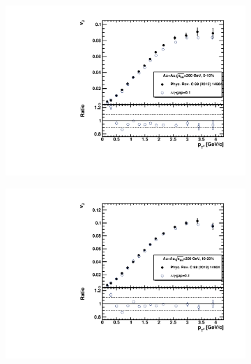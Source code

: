 \begin{figure}[ht]
    \begin{subfigure}{.49\textwidth}
        \centering
        \includegraphics[width=1.\linewidth]{Figures/v3_charged_hadrons_pt_cent0.pdf}
    \end{subfigure}
    \begin{subfigure}{.49\textwidth}
        \centering
        \includegraphics[width=1.\linewidth]{Figures/v3_charged_hadrons_pt_cent1.pdf}
    \end{subfigure}
    \\
    \begin{subfigure}{.49\textwidth}
        \centering

\end{subfigure}
\end{figure}
